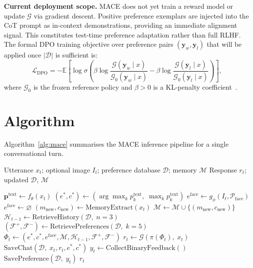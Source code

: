 \documentclass[conference]{IEEEtran}
\begin{document}
\textbf{Current deployment scope.}
MACE does not yet train a reward model or update $\mathcal{G}$
via gradient descent.
Positive preference exemplars are injected into the CoT prompt
as in-context demonstrations, providing an immediate alignment
signal.
This constitutes test-time preference adaptation rather than
full RLHF.
The formal DPO training objective over preference
pairs $(\mathbf{y}_w, \mathbf{y}_l)$ that will be applied
once $|\mathcal{D}|$ is sufficient is:
\begin{equation}
    \mathcal{L}_{\text{DPO}} =
    -\mathbb{E}\!\left[\log\sigma\!\left(
    \beta \log \frac{\mathcal{G}(\mathbf{y}_w \mid x)}
                    {\mathcal{G}_0(\mathbf{y}_w \mid x)}
    - \beta \log \frac{\mathcal{G}(\mathbf{y}_l \mid x)}
                      {\mathcal{G}_0(\mathbf{y}_l \mid x)}
    \right)\right],
    \label{eq:dpo}
\end{equation}
where $\mathcal{G}_0$ is the frozen reference policy and
$\beta{>}0$ is a KL-penalty coefficient~\cite{rafailov2023dpo}.

\section{Algorithm}
\label{sec:algorithm}

Algorithm~\ref{alg:mace} summarises the MACE inference pipeline
for a single conversational turn.

\begin{algorithm}
\caption{MACE: Single-Turn Inference}
\label{alg:mace}
\begin{algorithmic}[1]
\REQUIRE Utterance $x_t$; optional image $I_t$;
         preference database $\mathcal{D}$; memory $\mathcal{M}$
\ENSURE  Response $r_t$; updated $\mathcal{D}$, $\mathcal{M}$

\STATE $\mathbf{p}^{\text{text}} \leftarrow
       f_\theta(x_t)$ 
\STATE $(e^*, c^*) \leftarrow
       (\arg\max_k p^{\text{text}}_k,\;
        \max_k p^{\text{text}}_k)$
    \STATE $e^{\text{face}} \leftarrow
           g_\phi(I_t, \mathcal{P}_{\text{face}})$
\ELSE
    \STATE $e^{\text{face}} \leftarrow \varnothing$
\ENDIF
\STATE $(m_{\text{new}}, c_{\text{new}}) \leftarrow
       \text{MemoryExtract}(x_t)$ 
    \STATE $\mathcal{M} \leftarrow \mathcal{M} \cup
           \{(m_{\text{new}}, c_{\text{new}})\}$
\ENDIF
\STATE $\mathcal{H}_{t-1} \leftarrow
       \text{RetrieveHistory}(\mathcal{D},\; n{=}3)$
\STATE $(\mathcal{F}^+, \mathcal{F}^-) \leftarrow
       \text{RetrievePreferences}(\mathcal{D},\; k{=}5)$
\STATE $\Phi_t \leftarrow (e^*, c^*, e^{\text{face}},
       \mathcal{M}, \mathcal{H}_{t-1}, \mathcal{F}^+,
       \mathcal{F}^-)$ 
\STATE $r_t \leftarrow \mathcal{G}(\pi(\Phi_t),\; x_t)$
\STATE $\text{SaveChat}(\mathcal{D},\; x_t, r_t, e^*, c^*)$
\STATE $y_t \leftarrow \text{CollectBinaryFeedback}()$
\STATE $\text{SavePreference}(\mathcal{D},\; y_t)$
\RETURN $r_t$
\end{algorithmic}
\end{algorithm}
\end{document}
